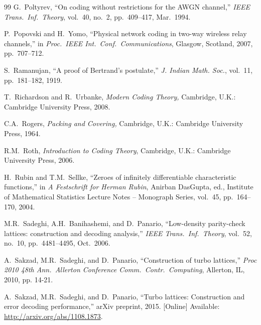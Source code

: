 \documentclass[main.tex]{subfiles}
\begin{document}
\begin{thebibliography}{99}
  G.~Poltyrev, ``On coding without restrictions for the AWGN channel,''
  \emph{IEEE Trans.\ Inf.\ Theory}, vol.\ 40, no.\ 2, pp.\ 409--417, Mar.\ 1994.

P.~Popovski and H.~Yomo, ``Physical network coding in two-way wireless relay channels,'' in
  \emph{Proc.\ IEEE Int.\ Conf.\ Communications}, Glasgow, Scotland, 2007, pp.\ 707--712.

 S.~Ramanujan, ``A proof of Bertrand's postulate,'' \emph{J. Indian Math. Soc.}, vol.\ 11, pp.\ 181--182, 1919.


 T.\  Richardson and R.\ Urbanke, \emph{Modern Coding Theory,} Cambridge, U.K.: Cambridge University Press, 2008.

C.A.~Rogers, \emph{Packing and Covering,} Cambridge, U.K.: Cambridge University Press, 1964.
% 

R.M.~Roth, \emph{Introduction to Coding Theory}, Cambridge, U.K.: Cambridge University Press, 2006.

 H.\ Rubin and T.M.\ Sellke, ``Zeroes of infinitely
  differentiable characteristic functions,'' in \emph{A Festschrift
    for Herman Rubin}, Anirban DasGupta, ed., 
  Institute of Mathematical Statistics Lecture Notes -- Monograph
  Series, vol.\ 45, pp.\ 164--170, 2004.
  
  M.R.\ Sadeghi, A.H.\ Banihashemi, and D.\ Panario, ``Low-density parity-check lattices: construction and decoding analysis,'' \emph{IEEE Trans.\ Inf.\ Theory}, vol.\ 52, no.\ 10, pp.\ 4481--4495, Oct.\ 2006.
  
  A.\ Sakzad, M.R.\ Sadeghi, and D.\ Panario, ``Construction of turbo lattices,''  \emph{ Proc  2010 48th Ann.\ Allerton Conference Comm.\ Contr.\ Computing}, Allerton, IL, 2010, pp. 14-21.
  
  A.\ Sakzad, M.R.\ Sadeghi, and D.\ Panario, ``Turbo lattices: Construction and error decoding
performance,'' arXiv preprint, 2015. [Online] Available: \url{http://arxiv.org/abs/1108.1873}.
  

\end{thebibliography}
\end{document}
